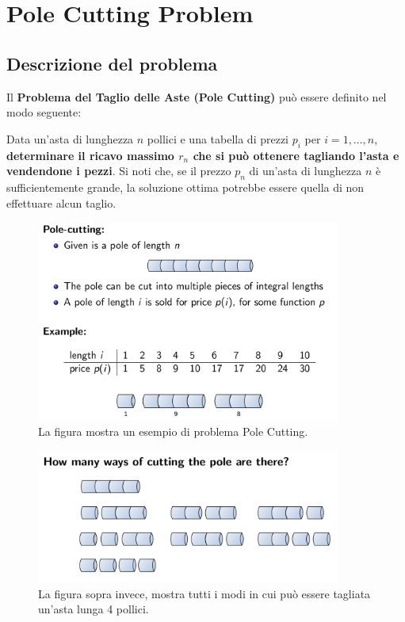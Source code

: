 \chapter{Pole Cutting Problem}

\section{Descrizione del problema}

Il \textbf{Problema del Taglio delle Aste (Pole Cutting)} può essere
definito nel modo seguente:

\begin{myblockquote}
  Data un'asta di lunghezza $n$ pollici e una tabella di prezzi $p_i$
  per $i = 1, \ldots, n$, \textbf{determinare il ricavo massimo $r_n$ che
    si può ottenere tagliando l'asta e vendendone i pezzi}. Si noti che, se
  il prezzo $p_n$ di un'asta di lunghezza $n$ è sufficientemente
  grande, la soluzione ottima potrebbe essere quella di non effettuare
  alcun taglio.
\end{myblockquote}

\begin{figure}[H]
  \centering
  \includegraphics[width=10cm, keepaspectratio]{capitoli/programmazione_dinamica/imgs/pole1.png}
  \caption{La figura mostra un esempio di problema Pole Cutting.}

\end{figure}

\begin{figure}[H]
  \centering
  \includegraphics[width=10cm, keepaspectratio]{capitoli/programmazione_dinamica/imgs/pole2.png}
  \caption{La figura sopra invece, mostra tutti i modi in cui può essere
    tagliata un'asta lunga 4 pollici.}
\end{figure}


